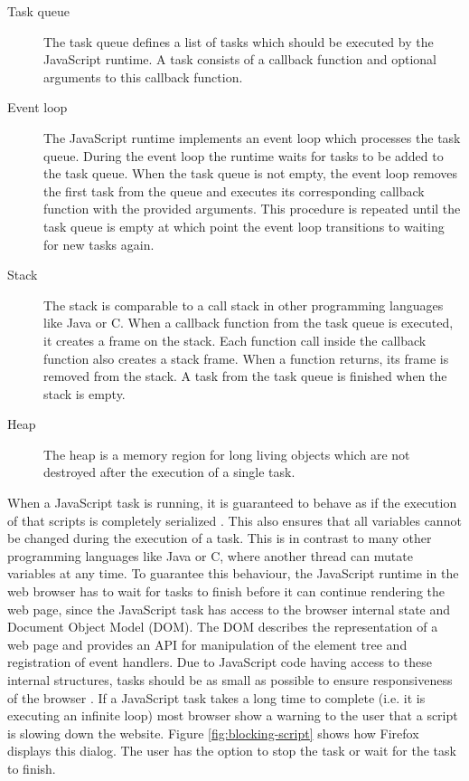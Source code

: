 \documentclass[
	ruledheaders=section,%
	class=report,%
	thesis={type=bachelor},%
	accentcolor=9c,%
	custommargins=true,%
	marginpar=false,%
	parskip=half-,%
	fontsize=11pt,%
]{tudapub}
\begin{document}
  \begin{description}
  \item[Task queue] The task queue defines a list of tasks which should be executed by the JavaScript runtime. A task consists of a callback function and optional arguments to this callback function.
  \item[Event loop] The JavaScript runtime implements an event loop which processes the task queue. During the event loop the runtime waits for tasks to be added to the task queue. When the task queue is not empty, the event loop removes the first task from the queue and executes its corresponding callback function with the provided arguments. This procedure is repeated until the task queue is empty at which point the event loop transitions to waiting for new tasks again.
  \item[Stack] The stack is comparable to a call stack in other programming languages like Java or C. When a callback function from the task queue is executed, it creates a frame on the stack. Each function call inside the callback function also creates a stack frame. When a function returns, its frame is removed from the stack. A task from the task queue is finished when the stack is empty.
  \item[Heap] The heap is a memory region for long living objects which are not destroyed after the execution of a single task.
  \end{description}

  When a JavaScript task is running, it is guaranteed to behave as if the execution of that scripts is completely serialized \cite{html5-specification}. This also ensures that all variables cannot be changed during the execution of a task. This is in contrast to many other programming languages like Java or C, where another thread can mutate variables at any time. To guarantee this behaviour, the JavaScript runtime in the web browser has to wait for tasks to finish before it can continue rendering the web page, since the JavaScript task has access to the browser internal state and Document Object Model (DOM). The DOM describes the representation of a web page and provides an API for manipulation of the element tree and registration of event handlers. Due to JavaScript code having access to these internal structures, tasks should be as small as possible to ensure responsiveness of the browser \cite{chrome-rail-model}. If a JavaScript task takes a long time to complete (i.e. it is executing an infinite loop) most browser show a warning to the user that a script is slowing down the website. Figure \ref{fig:blocking-script} shows how Firefox displays this dialog. The user has the option to stop the task or wait for the task to finish.
\end{document}
